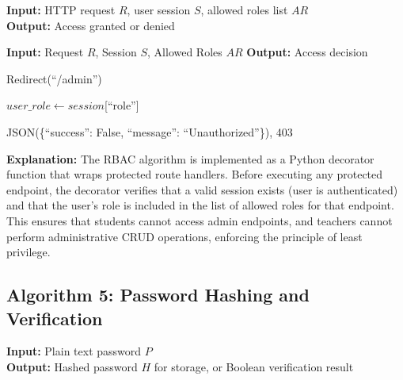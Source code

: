 \textbf{Input:} HTTP request $R$, user session $S$, allowed roles list $AR$ \\
\textbf{Output:} Access granted or denied

\begin{algorithm}[H]
\caption{Role-Based Access Control}
\begin{algorithmic}[1]

\State \textbf{Input:} Request $R$, Session $S$, Allowed Roles $AR$
\State \textbf{Output:} Access decision

        \State \Return Redirect(``/admin'') 
    \EndIf
    
    \State $user\_role \gets session$[``role'']
    
        \State \Return JSON(\{``success'': False, ``message'': ``Unauthorized''\}), 403
    \EndIf
    
\EndFunction

\end{algorithmic}
\end{algorithm}

\textbf{Explanation:}
The RBAC algorithm is implemented as a Python decorator function that wraps protected route handlers. Before executing any protected endpoint, the decorator verifies that a valid session exists (user is authenticated) and that the user's role is included in the list of allowed roles for that endpoint. This ensures that students cannot access admin endpoints, and teachers cannot perform administrative CRUD operations, enforcing the principle of least privilege.

\subsection{Algorithm 5: Password Hashing and Verification}

\textbf{Input:} Plain text password $P$ \\
\textbf{Output:} Hashed password $H$ for storage, or Boolean verification result


